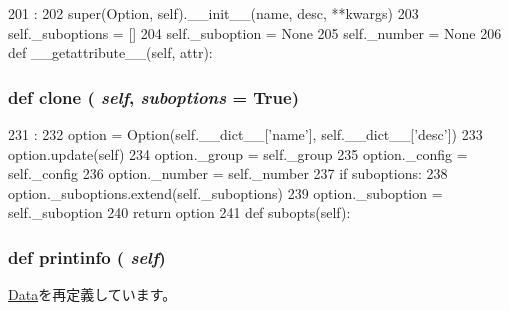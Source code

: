 \begin{DoxyCode}
201                                             :
202         super(Option, self).__init__(name, desc, **kwargs)
203         self._suboptions = []
204         self._suboption = None
205         self._number = None
206 
    def __getattribute__(self, attr):
\end{DoxyCode}
\hypertarget{classm5_1_1util_1_1jobfile_1_1Option_a4110248fff184e40b53c1cfa2bc3c649}{
\subsubsection[{clone}]{\setlength{\rightskip}{0pt plus 5cm}def clone ( {\em self}, \/   {\em suboptions} = {\ttfamily True})}}
\label{classm5_1_1util_1_1jobfile_1_1Option_a4110248fff184e40b53c1cfa2bc3c649}



\begin{DoxyCode}
231                                     :
232         option = Option(self.__dict__['name'], self.__dict__['desc'])
233         option.update(self)
234         option._group = self._group
235         option._config = self._config
236         option._number = self._number
237         if suboptions:
238             option._suboptions.extend(self._suboptions)
239             option._suboption = self._suboption
240         return option
241 
    def subopts(self):
\end{DoxyCode}
\hypertarget{classm5_1_1util_1_1jobfile_1_1Option_a40bc1aa85be1c4ba18cd144234c53984}{
\subsubsection[{printinfo}]{\setlength{\rightskip}{0pt plus 5cm}def printinfo ( {\em self})}}
\label{classm5_1_1util_1_1jobfile_1_1Option_a40bc1aa85be1c4ba18cd144234c53984}


\hyperlink{classm5_1_1util_1_1jobfile_1_1Data_a40bc1aa85be1c4ba18cd144234c53984}{Data}を再定義しています。


